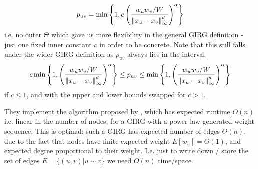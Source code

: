 \begin{equation}
    p_{uv} = \min \left \{ 
        1,
        c \left (
            \frac{w_u w_v / W}{\left\lVert x_u - x_v\right\rVert_\infty^d}
        \right )^\alpha    
    \right \}
    \label{eq:blasius_GIRG_puv}
\end{equation}
i.e. no outer $\Theta$ which gave us more flexibility in the general GIRG definition - just one fixed inner constant $c$ in order to be concrete. 
Note that this still falls under the wider GIRG definition 
as $p_{uv}$ always lies in the interval 
\begin{equation}
    c \min \left \{ 
        1,
        \left (
            \frac{w_u w_v / W}{\left\lVert x_u - x_v\right\rVert_\infty^d}
        \right )^\alpha    
    \right \} \leq p_{uv} \leq \min \left \{ 
        1,
        \left (
            \frac{w_u w_v / W}{\left\lVert x_u - x_v\right\rVert_\infty^d}
        \right )^\alpha    
    \right \}
\end{equation}
if $c \leq 1$, and with the upper and lower bounds swapped for $c > 1$.


They implement the algorithm proposed by \cite{bringmann2019geometric}, which has expected runtime $O(n)$ i.e. linear in the number of nodes, for a GIRG with a power law generated weight sequence.
This is optimal: such a GIRG has expected number of edges $\Theta(n)$, due to the fact that nodes have finite expected weight $E[w_u] = \Theta(1)$, and expected degree proportional to their weight. I.e. just to write down / store the set of edges $E = \{(u, v) | u \sim v \}$ we need $O(n)$ time/space.

